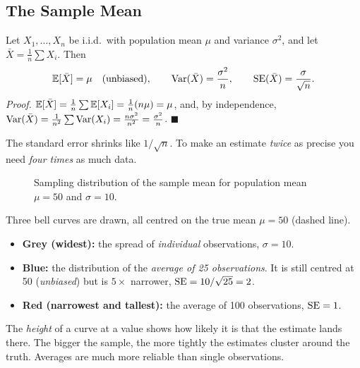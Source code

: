 \subsection{The Sample Mean}

Let $X_1,\dots,X_n$ be i.i.d.\ with population mean $\mu$ and variance $\sigma^2$, and let $\bar X=\frac1n\sum X_i$. Then
\[
  \mathbb{E}[\bar X]=\mu\quad(\text{unbiased}),\qquad
  \operatorname{Var}(\bar X)=\frac{\sigma^2}{n},\qquad
  \operatorname{SE}(\bar X)=\frac{\sigma}{\sqrt n}.
\]
\emph{Proof.} $\mathbb{E}[\bar X]=\frac1n\sum\mathbb{E}[X_i]=\frac1n(n\mu)=\mu$, and, by independence, $\operatorname{Var}(\bar X)=\frac1{n^2}\sum\operatorname{Var}(X_i)=\frac{n\sigma^2}{n^2}=\frac{\sigma^2}{n}$. $\blacksquare$

\begin{keyidea}
The standard error shrinks like $1/\sqrt n$. To make an estimate \emph{twice} as precise you need \emph{four times} as much data.
\end{keyidea}

\begin{figure}[!htbp]
\centering
{}
\caption{Sampling distribution of the sample mean for population mean $\mu=50$ and $\sigma=10$.}\label{fig:sampling}
\end{figure}

\begin{explain}
Three bell curves are drawn, all centred on the true mean $\mu=50$ (dashed line).
\begin{itemize}
  \item \textbf{Grey (widest):} the spread of \emph{individual} observations, $\sigma=10$.
  \item \textbf{Blue:} the distribution of the \emph{average of 25 observations}. It is still centred at 50 (\emph{unbiased}) but is $5\times$ narrower, $\operatorname{SE}=10/\sqrt{25}=2$.
  \item \textbf{Red (narrowest and tallest):} the average of 100 observations, $\operatorname{SE}=1$.
\end{itemize}
The \emph{height} of a curve at a value shows how likely it is that the estimate lands there. The bigger the sample, the more tightly the estimates cluster around the truth. Averages are much more reliable than single observations.
\end{explain}

